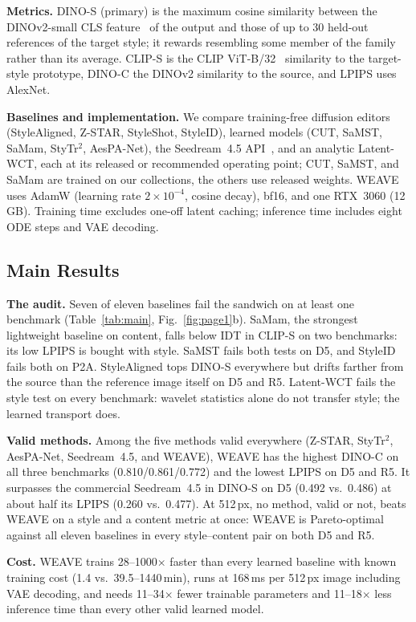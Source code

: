 \documentclass[conference]{IEEEtran}
\newcommand{\dinos}{DINO-S}
\newcommand{\dinoc}{DINO-C}
\newcommand{\clips}{CLIP-S}
\begin{document}
\noindent\textbf{Metrics.} \dinos{} (primary) is the maximum cosine similarity between the DINOv2-small CLS
feature~\cite{oquab2023dinov2} of the output and those of up to 30 held-out references of the target style;
it rewards resembling some member of the family rather than its average. \clips{} is the CLIP
ViT-B/32~\cite{radford2021clip} similarity to the target-style prototype, \dinoc{} the DINOv2 similarity to
the source, and LPIPS uses AlexNet.

\noindent\textbf{Baselines and implementation.} We compare training-free diffusion editors
(StyleAligned, Z-STAR, StyleShot, StyleID), learned models (CUT, SaMST, SaMam, StyTr$^2$, AesPA-Net), the
Seedream~4.5 API~\cite{seedream2025}, and an analytic Latent-WCT, each at its released or recommended
operating point; CUT, SaMST, and SaMam are trained on our collections, the others use released weights. WEAVE uses AdamW (learning rate $2\times10^{-4}$, cosine decay),
bf16, and one RTX~3060 (12\,GB). Training time excludes one-off latent caching; inference time includes
eight ODE steps and VAE decoding.


\subsection{Main Results}
\noindent\textbf{The audit.} Seven of eleven baselines fail the sandwich on at least one benchmark
(Table~\ref{tab:main}, Fig.~\ref{fig:page1}b). SaMam, the strongest lightweight baseline on content, falls
below IDT in \clips{} on two benchmarks: its low LPIPS is bought with style. SaMST fails both tests on D5,
and StyleID fails both on P2A. StyleAligned tops \dinos{} everywhere but drifts farther from the source
than the reference image itself on D5 and R5. Latent-WCT fails the style test on every benchmark: wavelet
statistics alone do not transfer style; the learned transport does.

\noindent\textbf{Valid methods.} Among the five methods valid everywhere (Z-STAR, StyTr$^2$, AesPA-Net,
Seedream~4.5, and WEAVE), WEAVE has the highest \dinoc{} on all three benchmarks (0.810/0.861/0.772) and the
lowest LPIPS on D5 and R5. It surpasses the commercial Seedream~4.5 in \dinos{} on D5 (0.492 vs.\ 0.486) at
about half its LPIPS (0.260 vs.\ 0.477). At 512\,px, no method, valid or not, beats WEAVE on a style and a
content metric at once: WEAVE is Pareto-optimal against all eleven baselines in every style--content pair
on both D5 and R5.

\noindent\textbf{Cost.} WEAVE trains 28--1000$\times$ faster than every learned baseline with known
training cost (1.4 vs.\ 39.5--1440\,min), runs at 168\,ms per 512\,px image including VAE decoding, and
needs 11--34$\times$ fewer trainable parameters and 11--18$\times$ less inference time than every other
valid learned model.
\end{document}
